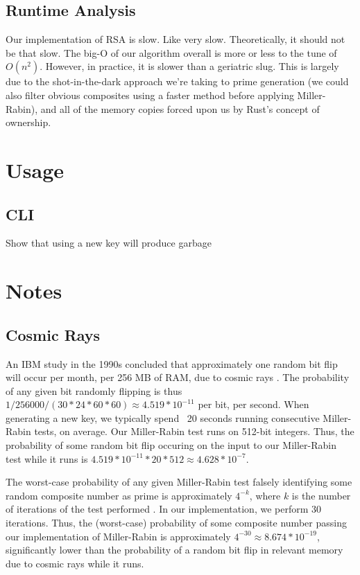 \documentclass{article}
\begin{document}
\subsection{Runtime Analysis}
Our implementation of RSA is slow. Like very slow. Theoretically, it should not be that slow. The big-O of our algorithm overall is more or less to the tune of $O(n^2)$. However, in practice, it is slower than a geriatric slug. This is largely due to the shot-in-the-dark approach we're taking to prime generation (we could also filter obvious composites using a faster method before applying Miller-Rabin), and all of the memory copies forced upon us by Rust's concept of ownership.


\section{Usage}
\subsection{CLI}
Show that using a new key will produce garbage


\section{Notes}
\subsection{Cosmic Rays}
\label{sec:rays}
An IBM study in the 1990s concluded that approximately one random bit flip will occur per month, per 256 MB of RAM, due to cosmic rays \cite{cosmic}. The probability of any given bit randomly flipping is thus $1 / 256000 / (30 * 24 * 60 * 60) \approx 4.519 * 10^{-11}$ per bit, per second. When generating a new key, we typically spend ~20 seconds running consecutive Miller-Rabin tests, on average. Our Miller-Rabin test runs on 512-bit integers. Thus, the probability of some random bit flip occuring on the input to our Miller-Rabin test while it runs is $4.519 * 10^{-11} * 20 * 512 \approx 4.628 * 10^{-7}$.

The worst-case probability of any given Miller-Rabin test falsely identifying some random composite number as prime is approximately $4^{-k }$, where $k$ is the number of iterations of the test performed \cite{wolfram}. In our implementation, we perform 30 iterations. Thus, the (worst-case) probability of some composite number passing our implementation of Miller-Rabin is approximately $4^{-30} \approx 8.674 * 10^{-19}$, significantly lower than the probability of a random bit flip in relevant memory due to cosmic rays while it runs.
\end{document}
